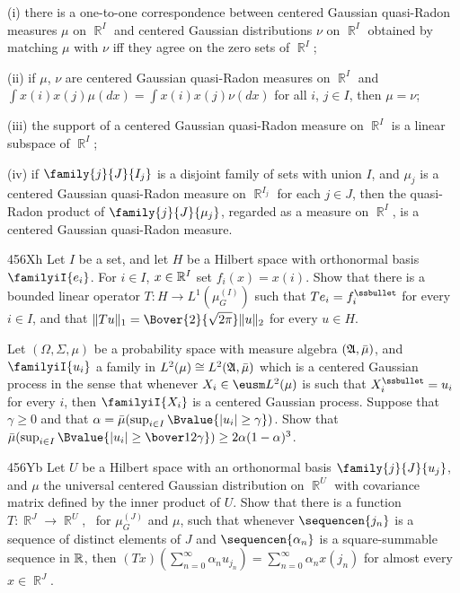 {\quad(i) there is a one-to-one correspondence between centered Gaussian quasi-Radon measures $\mu$ on $\BbbR^I$ and centered Gaussian distributions $\nu$ on $\BbbR^I$
obtained by matching $\mu$ with $\nu$ iff they agree on the zero sets of $\BbbR^I$;

\quad(ii) if $\mu$, $\nu$ are centered Gaussian quasi-Radon measures on $\BbbR^I$ and $\int x(i)x(j)\mu(dx)=\int x(i)x(j)\nu(dx)$ for all $i$, $j\in I$, then $\mu=\nu$;

\quad(iii) the support of a centered Gaussian quasi-Radon measure on $\BbbR^I$ is a linear subspace of $\BbbR^I$;

\quad(iv) if $\family{j}{J}{I_j}$ is a disjoint family of sets with union $I$, and $\mu_j$ is a centered Gaussian quasi-Radon measure on $\BbbR^{I_j}$ for each $j\in J$,
then the quasi-Radon product of $\family{j}{J}{\mu_j}$, regarded as a measure on $\BbbR^I$, is a centered Gaussian quasi-Radon measure.

\spheader 456Xh
Let $I$ be a set, and let $H$ be a Hilbert space with
orthonormal basis $\familyiI{e_i}$.   For $i\in I$, $x\in\Bbb R^I$ set
$f_i(x)=x(i)$.    Show that there is a bounded
linear operator $T:H\to L^1(\mu_G^{(I)})$ such that $Te_i=f_i^{\ssbullet}$
for every $i\in I$, and that $\|Tu\|_1=\Bover{2}{\sqrt{2\pi}}\|u\|_2$ 
for every $u\in H$.

Let $(\Omega,\Sigma,\mu)$ be a probability space with measure algebra
$(\frak A,\bar\mu)$, and $\familyiI{u_i}$ a family in
$L^2(\mu)\cong L^2(\frak A,\bar\mu)$ which is a centered
Gaussian process in the
sense that whenever $X_i\in\eusm L^2(\mu)$ is such that
$X_i^{\ssbullet}=u_i$ for every $i$, then $\familyiI{X_i}$ is a centered
Gaussian process.   Suppose that $\gamma\ge 0$ and that
$\alpha=\bar\mu(\sup_{i\in I}\Bvalue{|u_i|\ge\gamma})$.   Show that
$\bar\mu(\sup_{i\in I}\Bvalue{|u_i|\ge\bover12\gamma})
\ge 2\alpha(1-\alpha)^3$.

\spheader 456Yb Let $U$ be a Hilbert space with an orthonormal basis
$\family{j}{J}{u_j}$, and $\mu$ the universal centered Gaussian
distribution on $\BbbR^U$ with covariance matrix defined by the inner
product of $U$.   Show that there is a function $T:\BbbR^J\to\BbbR^U$,
\imp\ for $\mu_G^{(J)}$ and $\mu$, such that whenever $\sequencen{j_n}$
is a sequence of distinct elements of $J$ and $\sequencen{\alpha_n}$ is
a square-summable sequence in $\Bbb R$, then
$(Tx)(\sum_{n=0}^{\infty}\alpha_nu_{j_n})
=\sum_{n=0}^{\infty}\alpha_nx(j_n)$ for almost every $x\in\BbbR^J$.

}
